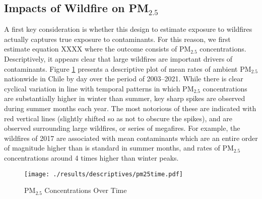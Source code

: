 \documentclass[11pt]{article}
\begin{document}
\begin{spacing}{1.3}
\subsection{Impacts of Wildfire on PM$_{2.5}$}
\label{sscn:results_pm25}
A first key consideration is whether this design to estimate exposure to wildfires actually captures true exposure to contaminants.  For this reason, we first estimate equation XXXX where the outcome consists of PM$_{2.5}$ concentrations.  Descriptively, it appears clear that large wildfires are important drivers of contaminants.  Figure \ref{fig:PM25} presents a descriptive plot of mean rates of ambient PM$_{2.5}$ nationwide in Chile by day over the period of 2003--2021.  While there is clear cyclical variation in line with temporal patterns in which PM$_{2.5}$ concentrations are substantially higher in winter than summer, key sharp spikes are observed during summer months each year.  The most notorious of these are indicated with red vertical lines (slightly shifted so as not to obscure the spikes), and are observed surrounding large wildfires, or series of megafires.  For example, the wildfires of 2017 are associated with mean contaminants which are an entire order of magnitude higher than is standard in summer months, and rates of PM$_{2.5}$ concentrations around 4 times higher than winter peaks.

\begin{figure}[ht!]
    \centering
    \texttt{[image: ./results/descriptives/pm25time.pdf]}
    \caption{PM$_{2.5}$ Concentrations Over Time}
    \label{fig:PM25}
\end{figure}





\end{spacing}
\end{document}
